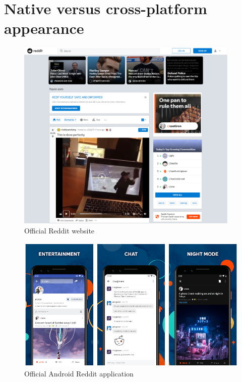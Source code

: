 \makeatletter
{}
\makeatother

\chapter{Native versus cross-platform appearance} \label{a:native_cross}

    \begin{figure}[ht]
        \centering
             \includegraphics[width=0.95\textwidth]{figures/reddit/reddit_web.png}
        \caption{Official Reddit website}
        \label{a:fig:reddit_web}
    \end{figure}
  
    \begin{figure}[ht]
        \centering
             \includegraphics[width=\textwidth]{figures/reddit/reddit_android.png}
        \caption{Official Android Reddit application}
        \label{a:fig:reddit_android}
    \end{figure}
    
